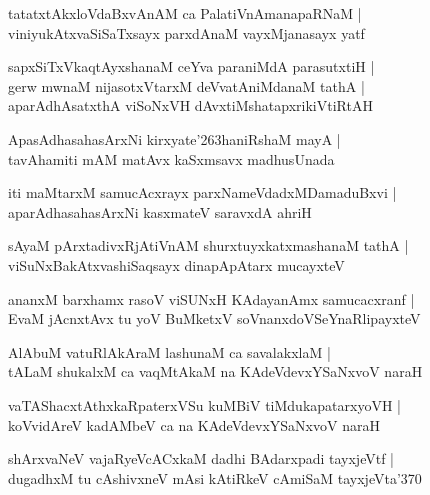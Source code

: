 \documentclass[twoside,12pt,openright]{book}
\def\S{\char'263}
\newcounter{shloka}[chapter]
\begin{document}
\begin{shloka}%
tatatxtAkxloVdaBxvAnAM ca PalatiVnAmanapaRNaM |\\
viniyukAtxvaSiSaTxsayx parxdAnaM vayxMjanasayx yatf 
\end{shloka}

\begin{shloka}%
sapxSiTxVkaqtAyxshanaM ceYva paraniMdA parasutxtiH |\\
gerw mwnaM nijasotxVtarxM deVvatAniMdanaM tathA |\\
aparAdhAsatxthA viSoNxVH dAvxtiMshatapxrikiVtiRtAH 
\end{shloka}

\begin{shloka}%
ApasAdhasahasArxNi kirxyate\S haniRshaM mayA |\\
tavAhamiti mAM matAvx kaSxmsavx madhusUnada
\end{shloka}

\begin{shloka}%
iti maMtarxM samucAcxrayx parxNameVdadxMDamaduBxvi |\\
aparAdhasahasArxNi kasxmateV saravxdA ahriH 
\end{shloka}

\begin{shloka}%
sAyaM pArxtadivxRjAtiVnAM shurxtuyxkatxmashanaM tathA |\\
viSuNxBakAtxvashiSaqsayx dinapApAtarx mucayxteV 
\end{shloka}

\begin{shloka}%
ananxM barxhamx rasoV viSUNxH KAdayanAmx samucacxranf |\\
EvaM jAcnxtAvx tu yoV BuMketxV soVnanxdoVSeYnaRlipayxteV 
\end{shloka}

\begin{shloka}%
AlAbuM vatuRlAkAraM lashunaM ca savalakxlaM |\\
tALaM shukalxM ca vaqMtAkaM na KAdeVdevxYSaNxvoV naraH 
\end{shloka}

\begin{shloka}%
vaTAShacxtAthxkaRpaterxVSu kuMBiV tiMdukapatarxyoVH |\\
koVvidAreV kadAMbeV ca na KAdeVdevxYSaNxvoV naraH 
\end{shloka}

\begin{shloka}%
shArxvaNeV vajaRyeVcACxkaM dadhi BAdarxpadi tayxjeVtf |\\
dugadhxM tu cAshivxneV mAsi kAtiRkeV cAmiSaM tayxjeVta\char'370
\end{shloka}
\end{document}

